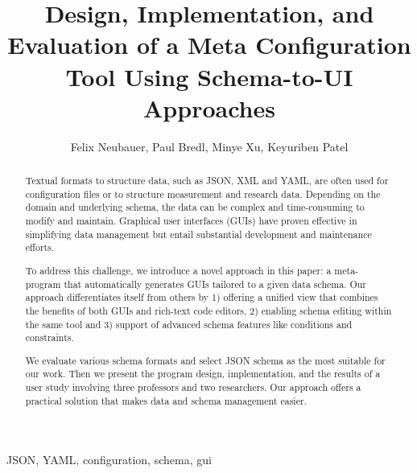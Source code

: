 \documentclass[lettersize,journal]{IEEEtran}
\begin{document}
 \title{Design, Implementation, and Evaluation of a Meta Configuration Tool Using Schema-to-UI Approaches}
 \author{Felix Neubauer, Paul Bredl, Minye Xu, Keyuriben Patel}



 \maketitle

 \begin{abstract}
 Textual formats to structure data, such as JSON, XML and YAML, are often used for configuration files or to structure measurement and research data.
 Depending on the domain and underlying schema, the data can be complex and time-consuming to modify and maintain.
 Graphical user interfaces (GUIs) have proven effective in simplifying data management but entail substantial development and maintenance efforts.
 
 To address this challenge, we introduce a novel approach in this paper: a meta-program that automatically generates GUIs tailored to a given data schema. 
 Our approach differentiates itself from others by 1) offering a unified view that combines the benefits of both GUIs and rich-text code editors, 2) enabling schema editing within the same tool and 3) support of advanced schema features like conditions and constraints. 
 
 We evaluate various schema formats and select JSON schema as the most suitable for our work.
 Then we present the program design, implementation, and the results of a user study involving three professors and two researchers. 
 Our approach offers a practical solution that makes data and schema management easier.
 
  

 \end{abstract}

 \begin{IEEEkeywords}
  JSON, YAML, configuration, schema, gui
 \end{IEEEkeywords}
\end{document}
